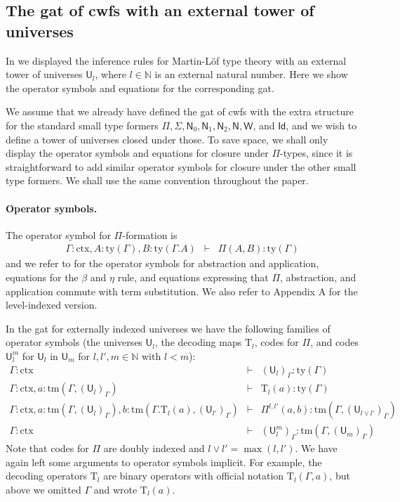 \documentclass[submission,copyright,creativecommons]{eptcs}
\newcommand{\Id}{\mathsf{Id}}
\newcommand{\UU}{\mathsf{U}}
\def\Nbb{\mathbb{N}}
\def\UU{\mathsf{U}}
\newcommand{\N}{\mathsf{N}}
\def\Pihat{\Pi}
\newcommand{\ctx}{\mathrm{ctx}}
\newcommand{\ty}{\mathrm{ty}}
\newcommand{\tm}{\mathrm{tm}}
\def\U{\mathsf{U}}
\newcommand{\Ta}{\mathrm{T}}
\def\W{\mathsf{W}}
\begin{document}
\subsection{The gat of cwfs with an external tower of universes}
In \cite[Section 3]{BezemCDE22} we displayed the inference rules for Martin-Löf type theory with an external tower of universes $\UU_l$, where $l \in \Nbb$ is an external natural number. Here we show the operator symbols and equations for the corresponding gat.

We assume that we already have defined the gat of cwfs with the extra structure for the standard small type formers $\Pi, \Sigma, \N_0, \N_1, \N_2, \N, \W$, and $\Id$, and we wish to define a tower of universes closed under those. To save space, we shall only display the operator symbols and equations for closure under $\Pi$-types, since it is straightforward to add similar operator symbols for closure under the other small type formers. We shall use the same convention throughout the paper.

\paragraph{Operator symbols.}
The operator symbol for $\Pi$-formation is
\begin{eqnarray*}
\Gamma : \ctx, A : \ty(\Gamma), B : \ty(\Gamma.A) &\vdash& \Pi(A,B) : \ty(\Gamma)
\end{eqnarray*}
and we refer to \cite{bezem:hofmann} for the operator symbols for abstraction and application, equations for the $\beta$ and $\eta$ rule, and equations expressing that $\Pi$, abstraction, and application commute with term substitution. We also refer to Appendix A for the level-indexed version.

In the gat for externally indexed universes we have the following families of operator symbols (the universes $\UU_l$, the decoding maps $\Ta_l$, codes for $\Pi$, and codes $\UU_l^m$ for $\UU_l$ in $\UU_m$ for $l, l' , m \in \Nbb$ with $l < m$):
\begin{eqnarray*}
\Gamma : \ctx &\vdash& (\U_{l})_\Gamma : \ty(\Gamma)\\
\Gamma : \ctx, a : \tm(\Gamma,(\U_{l})_\Gamma) &\vdash& {\Ta_{l}}(a) : \ty(\Gamma)\\
\Gamma : \ctx,
a : \tm(\Gamma,(\U_{l})_\Gamma),
b :  \tm(\Gamma . \Ta_{l}(a), (\U_{l'})_\Gamma)
&\vdash&
 \Pihat^{l,l'}(a,b) : \tm(\Gamma,(\U_{l \vee l'})_\Gamma)\\
 \Gamma : \ctx&\vdash&(\UU^m_l)_\Gamma: \tm(\Gamma,(\UU_{m})_\Gamma)
\end{eqnarray*}
Note that codes for $\Pi$ are doubly indexed and $l \vee l' = \max(l,l')$.
We have again left some arguments to operator symbols implicit. For example, the decoding operators $\Ta_l$ are binary operators with official notation $\Ta_l(\Gamma,a)$, but above we omitted $\Gamma$ and wrote $\Ta_l(a)$.
\end{document}
